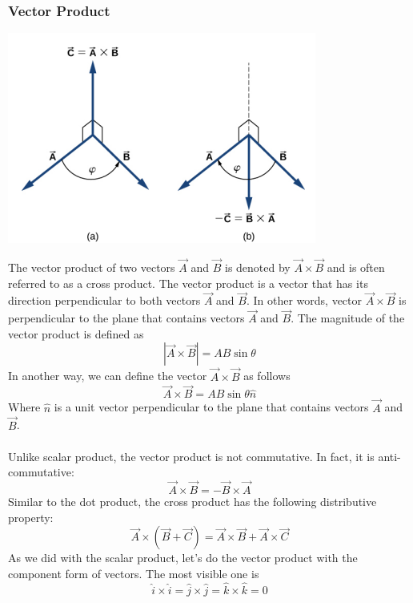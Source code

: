 \documentclass[12pt,addpoints]{exam}
\begin{document}
	\subsubsection*{Vector Product}
	\begin{center}
		\includegraphics[scale=0.5]{cross.png}
	\end{center}
	 The vector product of two vectors $\vec{A}$ and $\vec{B}$ is denoted by $\vec{A}\times\vec{B}$ and is often referred to as a cross product. The vector product is a vector that has its direction perpendicular to both vectors  $\vec{A}$ and $\vec{B}$. In other words, vector $\vec{A}\times\vec{B}$ is perpendicular to the plane that contains vectors $\vec{A}$ and $\vec{B}$. The magnitude of the vector product is defined as
	 $$|\vec{A} \times \vec{B}| = AB \sin \theta$$
	 In another way, we can define the vector $\vec{A}\times\vec{B}$ as follows
	 $$\vec{A}\times\vec{B}=AB \sin \theta \hat{n}$$
	 Where $\hat{n}$ is a unit vector perpendicular to the plane that contains vectors $\vec{A}$ and $\vec{B}$. \\ \\
	 Unlike scalar product, the vector product is not commutative. In fact, it is anti-commutative:
	 $$\vec{A} \times \vec{B} = - \vec{B} \times \vec{A} $$
	 Similar to the dot product, the cross product has the following distributive property:
	 $$\vec{A} \times (\vec{B} + \vec{C}) = \vec{A} \times \vec{B} + \vec{A} \times \vec{C}$$
	 As we did with the scalar product, let's do the vector product with the component form of vectors. The most visible one is
	 $$\hat{i} \times \hat{i} = \hat{j} \times \hat{j} = \hat{k} \times \hat{k} = 0$$
\end{document}
